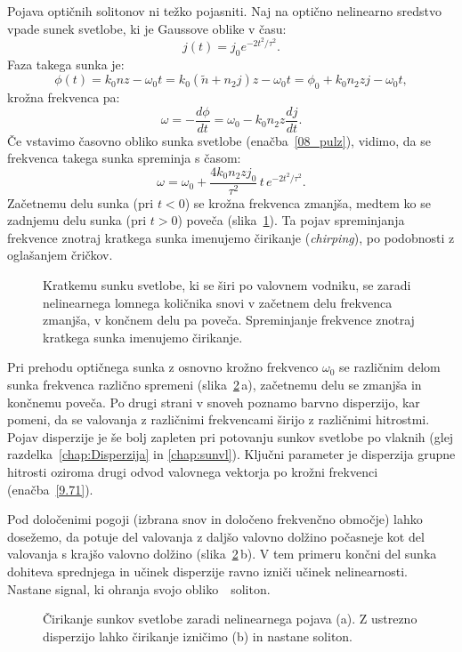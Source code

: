 Pojava optičnih solitonov ni težko pojasniti. Naj na optično nelinearno sredstvo
vpade sunek svetlobe, ki je Gaussove oblike v času:
\begin{equation}
j(t) = j_0 e^{-2t^2/\tau^2}.
\label{08_pulz}
\end{equation}
Faza takega sunka je:
\begin{equation}
\phi (t) = k_0 n z - \omega_0 t = k_0 (\tilde{n} + n_2 j)z - \omega_0 t = 
\phi_0 + k_0 n_2 z j - \omega_0 t,
\end{equation}
krožna frekvenca pa:
\begin{equation}
\omega = -\frac{d\phi}{dt} = \omega_0 - k_0 n_2 z \frac{dj}{dt}.
\end{equation}
Če vstavimo časovno obliko sunka svetlobe (enačba~\ref{08_pulz}), vidimo, da se 
frekvenca takega sunka spreminja s časom:
\begin{equation}
\omega = \omega_0 + \frac{4k_0 n_2 z j_0}{\tau^2} \, t \, e^{-2t^2/\tau^2}.
\label{eq:chirpi}
\end{equation}
Začetnemu delu sunka (pri $t<0$) se krožna frekvenca zmanjša, medtem ko se 
zadnjemu delu sunka (pri $t>0$) poveča (slika~\ref{fig:optsoliton}). 
Ta pojav spreminjanja frekvence znotraj kratkega sunka imenujemo čirikanje
({\it chirping}),  po podobnosti z oglašanjem čričkov.

\begin{figure}[ht]
\centering
\def\svgwidth{70truemm} 

\caption{Kratkemu sunku svetlobe, ki se širi po valovnem vodniku, se zaradi nelinearnega 
lomnega količnika snovi v začetnem delu frekvenca zmanjša, v končnem delu pa poveča.
Spreminjanje frekvence znotraj kratkega sunka imenujemo čirikanje.}
\label{fig:optsoliton}
\end{figure}
Pri prehodu optičnega sunka z osnovno krožno frekvenco $\omega_0$ se različnim delom sunka
frekvenca različno spremeni (slika~\ref{fig:chirp}\,a), začetnemu delu se zmanjša in 
končnemu poveča. Po drugi strani v snoveh poznamo barvno disperzijo, 
kar pomeni, da se valovanja z različnimi frekvencami širijo z različnimi hitrostmi.
 Pojav disperzije je še bolj zapleten pri potovanju sunkov svetlobe po vlaknih
(glej razdelka~\ref{chap:Disperzija} in \ref{chap:sunvl}). Ključni parameter je disperzija 
grupne hitrosti oziroma drugi odvod valovnega vektorja po krožni frekvenci (enačba~\ref{9.71}).

Pod določenimi pogoji (izbrana snov in določeno frekvenčno območje) 
lahko dosežemo, da potuje del valovanja z daljšo valovno dolžino počasneje kot del valovanja
s krajšo valovno dolžino (slika~\ref{fig:chirp}\,b). V tem primeru končni del sunka 
dohiteva sprednjega in učinek disperzije ravno izniči učinek nelinearnosti. 
Nastane signal, ki ohranja svojo obliko~\textendash~soliton. 
\begin{figure}[ht]
\centering
\def\svgwidth{128truemm} 

\caption{Čirikanje sunkov svetlobe zaradi nelinearnega pojava (a). Z ustrezno disperzijo lahko
čirikanje izničimo (b) in nastane soliton.}
\label{fig:chirp}
\end{figure}

